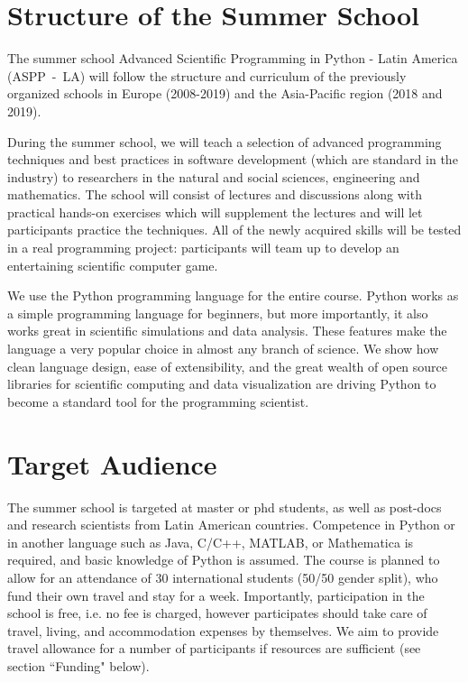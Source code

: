 \documentclass{article}[11pt]
\begin{document}
\section*{Structure of the Summer School}
The summer school Advanced Scientific Programming in Python - Latin America
(ASPP~-~LA) will follow the structure and curriculum of the previously
organized schools in Europe (2008-2019) and the Asia-Pacific region (2018 and
2019).

During the summer school, we will teach a selection of advanced programming
techniques and best practices in software development (which are standard in
the industry) to researchers in the natural and social sciences, engineering
and mathematics. The school will  consist of lectures and discussions along
with practical hands-on exercises which will supplement the lectures and will
let participants practice the techniques. All of the newly acquired skills will
be tested in a real programming project: participants will team up to develop
an entertaining scientific computer game.

We use the Python programming language for the entire course. Python works as a
simple programming language for beginners, but more importantly, it also works
great in scientific simulations and data analysis. These features make the
language a very popular choice in almost any branch of science. We show how
clean language design, ease of extensibility, and the great wealth of open
source libraries for scientific computing and data visualization are driving
Python to become a standard tool for the programming scientist.

\section*{Target Audience}
The summer school is targeted at master or phd students, as well as post-docs
and research scientists from Latin American countries. Competence in Python or
in another language such as Java, C/C++, MATLAB, or Mathematica is required,
and basic knowledge of Python is assumed. The course is planned to allow for an
attendance of 30 international students (50/50 gender split), who fund their
own travel and stay for a week. Importantly, participation in the school is
free, i.e. no fee is charged, however participates should take care of travel,
living, and accommodation expenses by themselves. We aim to provide travel
allowance for a number of participants if resources are sufficient (see section
``Funding" below).
\end{document}
